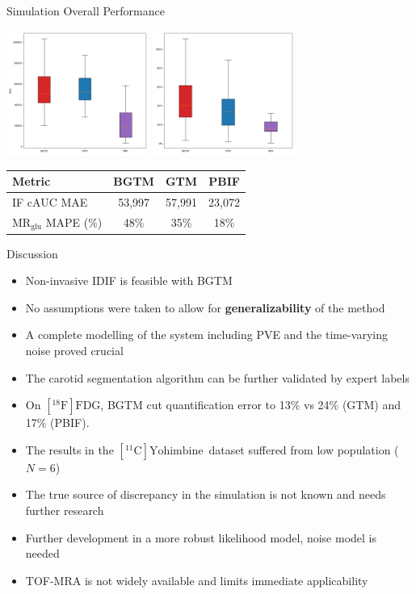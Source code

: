 \documentclass[aspectratio=169]{beamer}
\def\mrglu{\text{MR}_{\text{glu}}}
\newcommand{\fdg}{$[^{18}\mathrm{F}]\text{FDG}$}
\newcommand{\yohimbine}{$[^{11}\mathrm{C}]\text{Yohimbine}$}
\begin{document}
\begin{frame}[t]{Simulation Overall Performance}
	\centering
	\begin{center}
		\includegraphics[width=0.35\textwidth]{sim_curve_mae_boxplot.png}
		\includegraphics[width=0.35\textwidth]{sim_quantification_patlak_mape_boxplot.png}
	\end{center}

	{
	\small
	\begin{tabular}{l|ccc}
		\toprule
		Metric             & BGTM   & GTM    & PBIF   \\
		\midrule
		IF cAUC MAE        & 53,997 & 57,991 & 23,072 \\
		$\mrglu$ MAPE (\%) & 48\%   & 35\%   & 18\%   \\
		\bottomrule
	\end{tabular}

	}
\end{frame}
\begin{frame}{Discussion}
	\begin{itemize}
		\item Non-invasive IDIF is feasible with BGTM
		\item No assumptions were taken to allow for \textbf{generalizability} of the method
		\item A complete modelling of the system including PVE and the time-varying noise proved crucial
		\item The carotid segmentation algorithm can be further validated by expert labels
		\item On \fdg, BGTM cut quantification error to 13\% vs 24\% (GTM) and 17\% (PBIF).
		\item The results in the \yohimbine\ dataset suffered from low population ($N=6$)
		\item The true source of discrepancy in the simulation is not known and needs further research
		\item Further development in a more robust likelihood model, noise model is needed
		\item TOF-MRA is not widely available and limits immediate applicability
	\end{itemize}
\end{frame}
\end{document}
